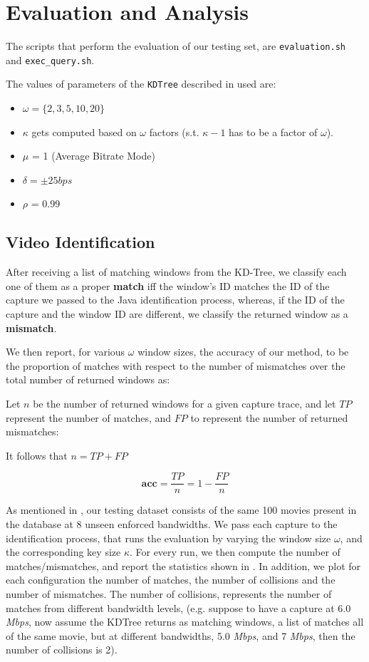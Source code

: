 \chapter{Evaluation and Analysis}\label{sec:results}

The scripts that perform the evaluation of our testing set, are
\texttt{evaluation.sh} and \texttt{exec\_query.sh}.

The values of parameters of the \texttt{KDTree} described in  used are:

\begin{itemize}
    \item $\omega = \{2,3,5,10,20\}$
    \item $\kappa$ gets computed based on $\omega$ factors (s.t. $\kappa - 1$
        has to be a factor of $\omega$).
    \item $\mu$ = 1 (Average Bitrate Mode)
    \item $\delta = \pm 25 bps$
    \item $\rho$ = 0.99
\end{itemize}

\section{Video Identification} After receiving a list of matching windows from
the KD-Tree, we classify each one of them as a proper \textbf{match} iff the
window's ID matches the ID of the capture we passed to the Java identification
process, whereas, if the ID of the capture and the window ID are different, we
classify the returned window as a \textbf{mismatch}.

We then report, for various $\omega$ window sizes, the accuracy of our method,
to be the proportion of matches with respect to the number of mismatches over
the total number of returned windows as:

Let $n$ be the number of returned windows for a given capture trace, and let
$TP$ represent the number of matches, and $FP$ to represent the number of
returned mismatches:

It follows that $n = TP + FP$

\begin{equation*}
    \mathbf{acc} = \dfrac{TP}{n} = 1 - \dfrac{FP}{n}
\end{equation*}

As mentioned in , our testing dataset consists of the same
100 movies present in the database at 8 unseen enforced bandwidths. We pass
each capture to the identification process, that runs the evaluation by varying
the window size $\omega$, and the corresponding key size $\kappa$. For every
run, we then compute the number of matches/mismatches, and report the
statistics shown in . In addition, we plot for each
configuration the number of matches, the number of collisions and the number of
mismatches. The number of collisions, represents the number of matches from
different bandwidth levels, (e.g. suppose to have a capture at 6.0 \emph{Mbps},
now assume the KDTree returns as matching windows, a list of matches all of the
same movie, but at different bandwidths, 5.0 \emph{Mbps}, and 7 \emph{Mbps},
then the number of collisions is 2).

